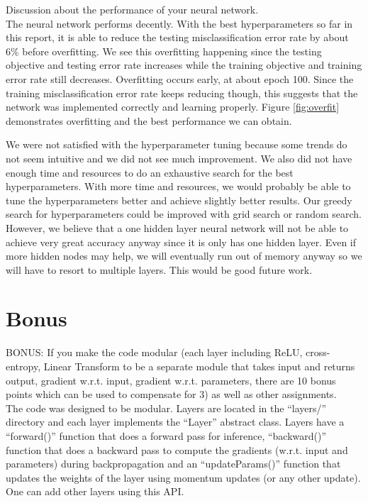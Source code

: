\documentclass[paper=a4, fontsize=11pt]{scrartcl}
\begin{document}
{\small Discussion about the performance of your neural network.}\\

The neural network performs decently.  With the best hyperparameters so far in this report, it is able to reduce the testing misclassification error rate by about 6\% before overfitting.  We see this overfitting happening since the testing objective and testing error rate increases while the training objective and training error rate still decreases.  Overfitting occurs early, at about epoch 100.  Since the training misclassification error rate keeps reducing though, this suggests that the network was implemented correctly and learning properly.  Figure \ref{fig:overfit} demonstrates overfitting and the best performance we can obtain.

We were not satisfied with the hyperparameter tuning because some trends do not seem intuitive and we did not see much improvement.  We also did not have enough time and resources to do an exhaustive search for the best hyperparameters.  With more time and resources, we would probably be able to tune the hyperparameters better and achieve slightly better results.  Our greedy search for hyperparameters could be improved with grid search or random search.  However, we believe that a one hidden layer neural network will not be able to achieve very great accuracy anyway since it is only has one hidden layer.  Even if more hidden nodes may help, we will eventually run out of memory anyway so we will have to resort to multiple layers.  This would be good future work.

\section{Bonus}

{\small BONUS: If you make the code modular (each layer including ReLU, cross-entropy, Linear Transform to be a separate module that takes input and returns output, gradient w.r.t. input, gradient w.r.t. parameters, there are 10 bonus points which can be used to compensate for 3) as well as other assignments.}\\

The code was designed to be modular.  Layers are located in the 		``layers/'' directory and each layer implements the ``Layer'' abstract class.  Layers have a ``forward()'' function that does a forward pass for inference, ``backward()'' function that does a backward pass to compute the gradients (w.r.t. input and parameters) during backpropagation and an ``updateParams()'' function that updates the weights of the layer using momentum updates (or any other update).  One can add other layers using this API.
\end{document}
